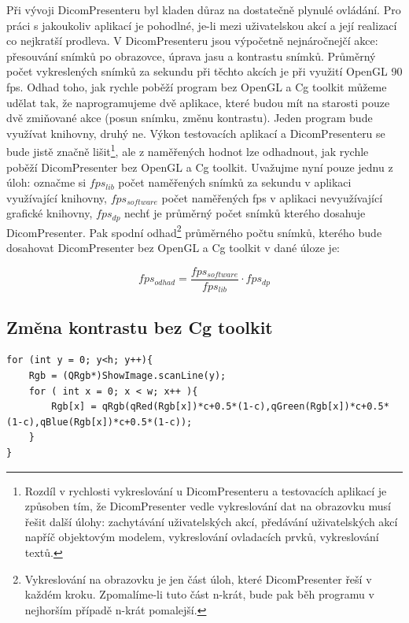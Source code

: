 Při vývoji DicomPresenteru byl kladen důraz na dostatečně plynulé ovládání. Pro práci s jakoukoliv aplikací je pohodlné, je-li mezi uživatelskou akcí a její realizací co nejkratší prodleva. V DicomPresenteru jsou výpočetně nejnáročnejčí akce: přesouvání snímků po obrazovce, úprava jasu a kontrastu snímků. Průměrný počet vykreslených snímků za sekundu při těchto akcích je při využití OpenGL 90 fps. Odhad toho, jak rychle poběží program bez OpenGL a Cg toolkit můžeme udělat tak, že naprogramujeme dvě aplikace, které budou mít na starosti pouze dvě zmiňované akce (posun snímku, změnu kontrastu). Jeden program bude využívat knihovny, druhý ne. Výkon testovacích aplikací a DicomPresenteru se bude jistě značně lišit\footnote{Rozdíl v rychlosti vykreslování u DicomPresenteru a testovacích aplikací je způsoben tím, že DicomPresenter vedle vykreslování dat na obrazovku musí řešit další úlohy: zachytávání uživatelských akcí, předávání uživatelských akcí napříč objektovým modelem, vykreslování ovladacích prvků, vykreslování textů.}, ale z naměřených hodnot lze odhadnout, jak rychle poběží DicomPresenter bez OpenGL a Cg toolkit. Uvažujme nyní pouze jednu z úloh: označme si $fps_{lib}$ počet naměřených snímků za sekundu v aplikaci využívající knihovny, $fps_{software}$ počet naměřených fps v aplikaci nevyužívající grafické knihovny, $fps_{dp}$ nechť je průměrný počet snímků kterého dosahuje DicomPresenter. Pak spodní odhad\footnote{Vykreslování na obrazovku je jen část úloh, které DicomPresenter řeší v každém kroku. Zpomalíme-li tuto část n-krát, bude pak běh programu v nejhorším případě n-krát pomalejší.} průměrného počtu snímků, kterého bude dosahovat DicomPresenter bez OpenGL a Cg toolkit v dané úloze je:

\begin{equation}
fps_{odhad} = \frac{fps_{software}}{fps_{lib}} \cdot fps_{dp}
\end{equation}

\subsection{Změna kontrastu bez Cg toolkit}

\begin{lstlisting}[label=DicomImageClass,caption={...}]
for (int y = 0; y<h; y++){
	Rgb = (QRgb*)ShowImage.scanLine(y);
	for ( int x = 0; x < w; x++ ){
		Rgb[x] = qRgb(qRed(Rgb[x])*c+0.5*(1-c),qGreen(Rgb[x])*c+0.5*(1-c),qBlue(Rgb[x])*c+0.5*(1-c));
	}
}
\end{lstlisting}

